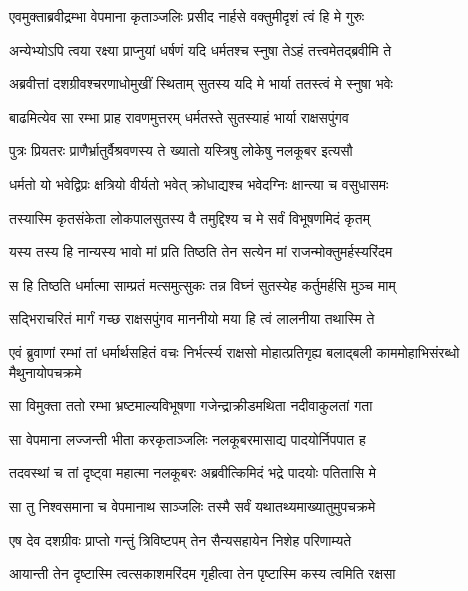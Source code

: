 \twolineshloka
{एवमुक्ताब्रवीद्रम्भा वेपमाना कृताञ्जलिः}
{प्रसीद नार्हसे वक्तुमीदृशं त्वं हि मे गुरुः} %

\twolineshloka
{अन्येभ्योऽपि त्वया रक्ष्या प्राप्नुयां धर्षणं यदि}
{धर्मतश्च स्नुषा तेऽहं तत्त्वमेतद्ब्रवीमि ते} %

\twolineshloka
{अब्रवीत्तां दशग्रीवश्चरणाधोमुखीं स्थिताम्}
{सुतस्य यदि मे भार्या ततस्त्वं मे स्नुषा भवेः} %

\twolineshloka
{बाढमित्येव सा रम्भा प्राह रावणमुत्तरम्}
{धर्मतस्ते सुतस्याहं भार्या राक्षसपुंगव} %

\twolineshloka
{पुत्रः प्रियतरः प्राणैर्भ्रातुर्वैश्रवणस्य ते}
{ख्यातो यस्त्रिषु लोकेषु नलकूबर इत्यसौ} %

\twolineshloka
{धर्मतो यो भवेद्विप्रः क्षत्रियो वीर्यतो भवेत्}
{क्रोधाद्यश्च भवेदग्निः क्षान्त्या च वसुधासमः} %

\twolineshloka
{तस्यास्मि कृतसंकेता लोकपालसुतस्य वै}
{तमुद्दिश्य च मे सर्वं विभूषणमिदं कृतम्} %

\twolineshloka
{यस्य तस्य हि नान्यस्य भावो मां प्रति तिष्ठति}
{तेन सत्येन मां राजन्मोक्तुमर्हस्यरिंदम} %

\twolineshloka
{स हि तिष्ठति धर्मात्मा साम्प्रतं मत्समुत्सुकः}
{तन्न विघ्नं सुतस्येह कर्तुमर्हसि मुञ्च माम्} %

\twolineshloka
{सद्भिराचरितं मार्गं गच्छ राक्षसपुंगव}
{माननीयो मया हि त्वं लालनीया तथास्मि ते} %

\threelineshloka
{एवं ब्रुवाणां रम्भां तां धर्मार्थसहितं वचः}
{निर्भर्त्स्य राक्षसो मोहात्प्रतिगृह्य बलाद्बली}
{काममोहाभिसंरब्धो मैथुनायोपचक्रमे} %

\twolineshloka
{सा विमुक्ता ततो रम्भा भ्रष्टमाल्यविभूषणा}
{गजेन्द्राक्रीडमथिता नदीवाकुलतां गता} %

\twolineshloka
{सा वेपमाना लज्जन्ती भीता करकृताञ्जलिः}
{नलकूबरमासाद्य पादयोर्निपपात ह} %

\twolineshloka
{तदवस्थां च तां दृष्ट्वा महात्मा नलकूबरः}
{अब्रवीत्किमिदं भद्रे पादयोः पतितासि मे} %

\twolineshloka
{सा तु निश्वसमाना च वेपमानाथ साञ्जलिः}
{तस्मै सर्वं यथातथ्यमाख्यातुमुपचक्रमे} %

\twolineshloka
{एष देव दशग्रीवः प्राप्तो गन्तुं त्रिविष्टपम्}
{तेन सैन्यसहायेन निशेह परिणाम्यते} %

\twolineshloka
{आयान्ती तेन दृष्टास्मि त्वत्सकाशमरिंदम}
{गृहीत्वा तेन पृष्टास्मि कस्य त्वमिति रक्षसा} %

